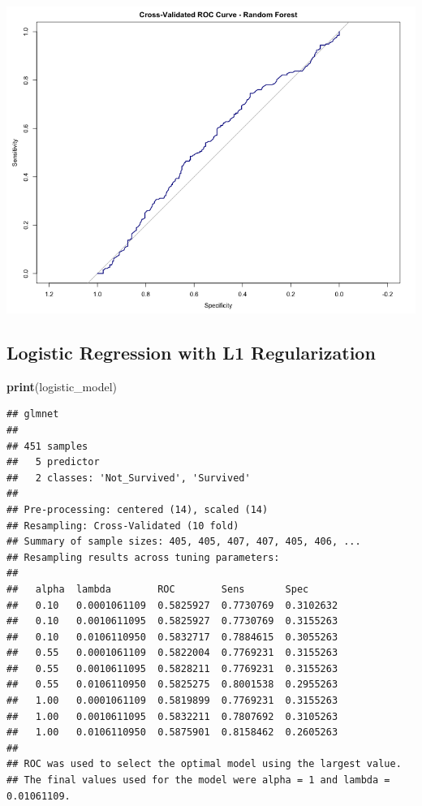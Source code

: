 \documentclass[
  11pt,
]{article}
\newenvironment{Shaded}{\begin{snugshade}}{\end{snugshade}}
\newcommand{\FunctionTok}[1]{\textcolor[rgb]{0.13,0.29,0.53}{\textbf{#1}}}
\newcommand{\NormalTok}[1]{#1}
\begin{document}
\includegraphics[width=0.8\linewidth]{../outputs/plots/ml/rf_cv_roc_curve}

\subsection{Logistic Regression with L1
Regularization}\label{logistic-regression-with-l1-regularization}

\begin{Shaded}
\begin{Highlighting}[]
\FunctionTok{print}\NormalTok{(logistic\_model)}
\end{Highlighting}
\end{Shaded}

\begin{verbatim}
## glmnet 
## 
## 451 samples
##   5 predictor
##   2 classes: 'Not_Survived', 'Survived' 
## 
## Pre-processing: centered (14), scaled (14) 
## Resampling: Cross-Validated (10 fold) 
## Summary of sample sizes: 405, 405, 407, 407, 405, 406, ... 
## Resampling results across tuning parameters:
## 
##   alpha  lambda        ROC        Sens       Spec     
##   0.10   0.0001061109  0.5825927  0.7730769  0.3102632
##   0.10   0.0010611095  0.5825927  0.7730769  0.3155263
##   0.10   0.0106110950  0.5832717  0.7884615  0.3055263
##   0.55   0.0001061109  0.5822004  0.7769231  0.3155263
##   0.55   0.0010611095  0.5828211  0.7769231  0.3155263
##   0.55   0.0106110950  0.5825275  0.8001538  0.2955263
##   1.00   0.0001061109  0.5819899  0.7769231  0.3155263
##   1.00   0.0010611095  0.5832211  0.7807692  0.3105263
##   1.00   0.0106110950  0.5875901  0.8158462  0.2605263
## 
## ROC was used to select the optimal model using the largest value.
## The final values used for the model were alpha = 1 and lambda = 0.01061109.
\end{verbatim}
\end{document}
